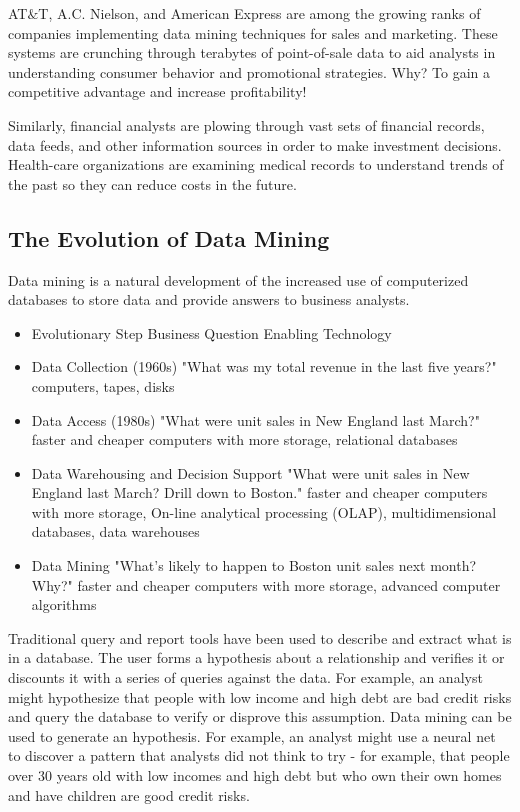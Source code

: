 \documentclass[12pt]{article}
\begin{document}
AT$\&$T, A.C. Nielson, and American Express are among the growing ranks of companies implementing data mining techniques for sales and marketing. These systems are crunching through terabytes of point-of-sale data to aid analysts in understanding consumer behavior and promotional strategies. Why? To gain a competitive advantage and increase profitability!

Similarly, financial analysts are plowing through vast sets of financial records, data feeds, and other information sources in order to make investment decisions. Health-care organizations are examining medical records to understand trends of the past so they can reduce costs in the future.

\subsection{The Evolution of Data Mining}
Data mining is a natural development of the increased use of computerized databases to store data and provide answers to business analysts.

\begin{itemize}
\item Evolutionary Step
 Business Question
 Enabling Technology

\item  Data Collection (1960s)
 "What was my total revenue in the last five years?"
 computers, tapes, disks

\item  Data Access (1980s)
 "What were unit sales in New England last March?"
 faster and cheaper computers with more storage, relational databases

\item Data Warehousing and Decision Support
 "What were unit sales in New England last March? Drill down to Boston."
 faster and cheaper computers with more storage, On-line analytical processing (OLAP), multidimensional databases, data warehouses

\item Data Mining
 "What's likely to happen to Boston unit sales next month? Why?"
 faster and cheaper computers with more storage, advanced computer algorithms

\end{itemize}

Traditional query and report tools have been used to describe and extract what is in a database. The user forms a hypothesis about a relationship and verifies it or discounts it with a series of queries against the data. For example, an analyst might hypothesize that people with low income and high debt are bad credit risks and query the database to verify or disprove this assumption. Data mining can be used to generate an hypothesis. For example, an analyst might use a neural net to discover a pattern that analysts did not think to try - for example, that people over 30 years old with low incomes and high debt but who own their own homes and have children are good credit risks.
\end{document}
